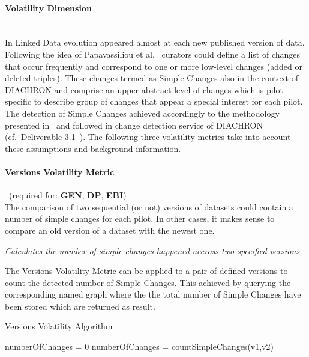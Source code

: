 \paragraph{Volatility Dimension}~\\ %
In Linked Data evolution appeared almost at each new published version of data. Following the idea of Papavassiliou et al.~\cite{TODS13} curators could define a list of changes that occur frequently and correspond to one or more low-level changes (added or deleted triples). These changes termed as Simple Changes also in the context of DIACHRON and comprise an upper abstract level of changes which is pilot-specific to describe group of changes that appear a special interest for each pilot. The detection of Simple Changes achieved accordingly to the methodology presented in~\cite{TODS13} and followed in change detection service of DIACHRON (cf.\ Deliverable 3.1~\cite{diachron-D3.1}). The following three volatility metrics take into account these assumptions and background information.

\paragraph{Versions Volatility Metric}~(required for: \textbf{GEN}, \textbf{DP}, \textbf{EBI})~\\ %
The comparison of two sequential (or not) versions of datasets could contain a number of simple changes for each pilot. In other cases, it makes sense to compare an old version of a dataset with the newest one. 

\begin{mdframed}[style=metricdefinition]
\emph{Calculates the number of simple changes happened accross two specified versions.}
\end{mdframed}

The Versions Volatility Metric can be applied to a pair
of defined versions to count the detected number of Simple Changes. This achieved by querying the corresponding named graph where the the total number of Simple Changes have been stored which are returned as result. 

\begin{algorithm}
\caption{Versions Volatility Algorithm}
\begin{algorithmic}[1]
\State numberOfChanges = 0
\EndProcedure
{}
\State numberOfChanges = countSimpleChanges(v1,v2)
\EndProcedure
\State {}
\end{algorithmic}
\end{algorithm}

